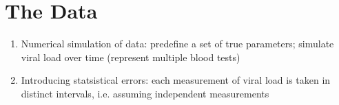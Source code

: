 \section{The Data}
\label{sec:data}

\begin{enumerate}
    \item Numerical simulation of data: predefine a set of true parameters; simulate viral load over time (represent multiple blood tests)
    \item Introducing statsistical errors: each measurement of viral load is taken in distinct intervals, i.e. assuming independent measurements
\end{enumerate}



